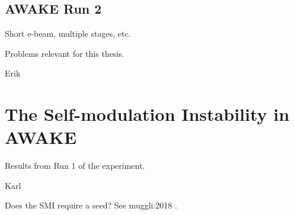 \subsection{AWAKE Run 2}
\label{WFA:AWAKE:R2}

Short e-beam, multiple stages, etc.

Problems relevant for this thesis.

Erik \cite{adli:2016a}

\section{The Self-modulation Instability in AWAKE}
\label{WFA:SMI}

Results from Run 1 of the experiment.

Karl \cite{rieger:2017}

Does the SMI require a seed? See muggli:2018 \cite{muggli:2018}.

